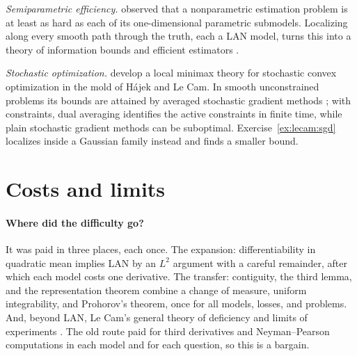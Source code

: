 \begin{refsection}
\emph{Semiparametric efficiency.} \textcite{Stein1956} observed that a nonparametric estimation problem is at least as hard as each of its one-dimensional parametric submodels. Localizing along every smooth path through the truth, each a LAN model, turns this into a theory of information bounds and efficient estimators \parencites{BickelKlaassenRitovWellner1993}[Chapter~25]{vanderVaart1998}.

\emph{Stochastic optimization.} \textcite{DuchiRuan2021} develop a local minimax theory for stochastic convex optimization in the mold of Hájek and Le Cam. In smooth unconstrained problems its bounds are attained by averaged stochastic gradient methods \parencite{PolyakJuditsky1992}; with constraints, dual averaging identifies the active constraints in finite time, while plain stochastic gradient methods can be suboptimal. Exercise~\ref{ex:lecam:sgd} localizes inside a Gaussian family instead and finds a smaller bound.

\section{Costs and limits}\label{sec:lecam:costs}

\paragraph{Where did the difficulty go?}
It was paid in three places, each once. The expansion: differentiability in quadratic mean implies LAN by an $L^2$ argument with a careful remainder, after which each model costs one derivative. The transfer: contiguity, the third lemma, and the representation theorem combine a change of measure, uniform integrability, and Prohorov's theorem, once for all models, losses, and problems. And, beyond LAN, Le Cam's general theory of deficiency and limits of experiments \parencite{LeCam1972,LeCam1986}. The old route paid for third derivatives and Neyman--Pearson computations in each model and for each question, so this is a bargain.


\end{refsection}
